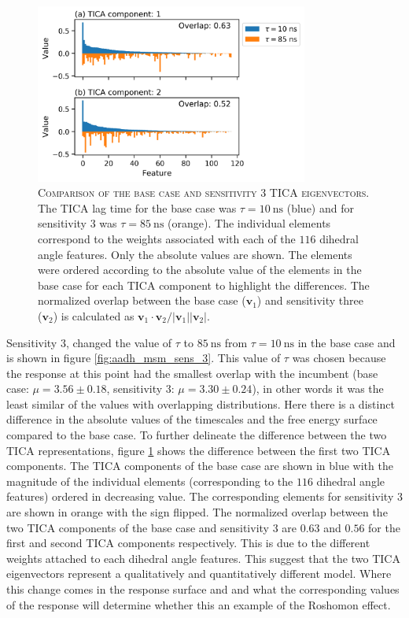 \begin{figure}
    \centering
    \includegraphics[width=0.8\textwidth]{chapters/msm_optimization/figures/aadh_msm_sens_3_tica.png}
    \caption[Comparison of the base case and sensitivity 3 TICA eigenvectors]{\textsc{Comparison of the base case and sensitivity 3 TICA eigenvectors}. The TICA lag time for the base case was $\tau=\SI{10}{\nano\second}$ (blue) and for sensitivity 3 was $\tau=\SI{85}{\nano\second}$ (orange). The individual elements correspond to the weights associated with each of the $116$ dihedral angle features. Only the absolute values are shown. The elements were ordered according to the absolute value of the elements in the base case for each TICA component to highlight the differences. The normalized overlap between the base case ($\mathbf{v}_{1}$) and sensitivity three ($\mathbf{v}_{2}$) is calculated as $\mathbf{v}_{1}\cdot\mathbf{v}_{2}/|\mathbf{v}_{1}||\mathbf{v}_{2}|$.}
    \label{fig:aadh_msm_sens_3_tica}
\end{figure}

Sensitivity 3, changed the value of $\tau$ to $\SI{85}{\nano\second}$ from $\tau = \SI{10}{\nano\second}$ in the base case and is shown in figure \ref{fig:aadh_msm_sens_3}.   This value of $\tau$ was chosen because the response at this point had the smallest  overlap with the incumbent (base case: $\mu=3.56 \pm 0.18$, sensitivity 3: $\mu=3.30 \pm 0.24$), in other words it was the least similar of the values with overlapping distributions. Here there is a distinct difference in the absolute values of the timescales and the free energy surface compared to the base case. To further delineate the difference between the two TICA representations, figure \ref{fig:aadh_msm_sens_3_tica} shows the difference between the first two TICA components. The  TICA components of the base case are shown in blue with the magnitude of the individual elements (corresponding to the $116$ dihedral angle features) ordered in decreasing value. The corresponding elements for sensitivity 3 are shown in orange with the sign flipped. The normalized overlap between the two TICA components of the base case and sensitivity 3 are $0.63$ and $0.56$  for the first and second TICA components respectively. This is due to the different weights attached to each dihedral angle features. This suggest that the two TICA eigenvectors represent a qualitatively and quantitatively different model. Where this change comes in the response surface and and what the corresponding values of the response will determine whether this an example of the Roshomon effect. 


